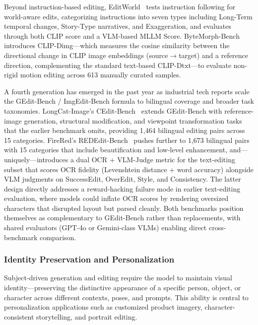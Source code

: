 \documentclass{llmxive}
\begin{document}
Beyond instruction-based editing, EditWorld~\citep{EditWorld} tests instruction following for world-aware edits, categorizing instructions into seven types including Long-Term temporal changes, Story-Type narratives, and Exaggeration, and evaluates through both CLIP score and a VLM-based MLLM Score. ByteMorph-Bench~\citep{ByteMorph} introduces CLIP-Dimg---which measures the cosine similarity between the directional change in CLIP image embeddings (source$\to$target) and a reference direction, complementing the standard text-based CLIP-Dtxt---to evaluate non-rigid motion editing across 613 manually curated samples.

A fourth generation has emerged in the past year as industrial tech reports scale the GEdit-Bench / ImgEdit-Bench formula to bilingual coverage and broader task taxonomies. LongCat-Image's CEdit-Bench~\citep{team2025longcat} extends GEdit-Bench with reference-image generation, structural modification, and viewpoint transformation tasks that the earlier benchmark omits, providing 1{,}464 bilingual editing pairs across 15 categories. FireRed's REDEdit-Bench~\citep{team2026firered} pushes further to 1{,}673 bilingual pairs with 15 categories that include beautification and low-level enhancement, and---uniquely---introduces a dual OCR + VLM-Judge metric for the text-editing subset that scores OCR fidelity (Levenshtein distance + word accuracy) alongside VLM judgments on SuccessEdit, OverEdit, Style, and Consistency. The latter design directly addresses a reward-hacking failure mode in earlier text-editing evaluation, where models could inflate OCR scores by rendering oversized characters that disrupted layout but parsed cleanly. Both benchmarks position themselves as complementary to GEdit-Bench rather than replacements, with shared evaluators (GPT-4o or Gemini-class VLMs) enabling direct cross-benchmark comparison.


\subsubsection{Identity Preservation and Personalization}

Subject-driven generation and editing require the model to maintain visual identity---preserving the distinctive appearance of a specific person, object, or character across different contexts, poses, and prompts. This ability is central to personalization applications such as customized product imagery, character-consistent storytelling, and portrait editing.
\end{document}
